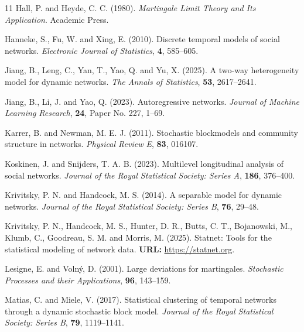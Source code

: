 \documentclass[12pt]{article}
\newcommand{\0}{{\bf 0}}
\begin{document}
\begin{thebibliography}{11}
Hall, P. and Heyde, C. C. (1980). \textit{Martingale Limit Theory and Its Application}. Academic Press.

Hanneke, S., Fu, W. and Xing, E. (2010). Discrete temporal models of social networks. \textit{Electronic Journal of Statistics}, \textbf{4}, 585–605.

Jiang, B., Leng, C., Yan, T., Yao, Q. and Yu, X. (2025). A two-way heterogeneity model for dynamic networks. \textit{The Annals of Statistics}, \textbf{53}, 2617--2641.

Jiang, B., Li, J. and Yao, Q. (2023). Autoregressive networks. \textit{Journal of Machine Learning Research}, \textbf{24}, Paper No. 227, 1--69.


Karrer, B. and Newman, M. E. J. (2011). Stochastic blockmodels and community structure in networks. \textit{Physical Review E}, \textbf{83}, 016107.

Koskinen, J. and Snijders, T. A. B. (2023). Multilevel longitudinal analysis of social networks. \textit{Journal of the Royal Statistical Society: Series A}, \textbf{186}, 376--400.


Krivitsky, P. N. and Handcock, M. S. (2014). A separable model for dynamic networks. \textit{Journal of the Royal Statistical Society: Series B}, \textbf{76}, 29–48.

Krivitsky, P. N., Handcock, M. S., Hunter, D. R., Butts, C. T., Bojanowski, M., Klumb,
C., Goodreau, S. M. and Morris, M. (2025).
\newblock Statnet: Tools for the statistical modeling of network data.
\newblock \textbf{URL:}  { \hypersetup{urlcolor=black}\url{https://statnet.org}}.



Lesigne, E. and Voln\'{y}, D. (2001). Large deviations for martingales. \textit{Stochastic Processes and their Applications}, \textbf{96}, 143–159.

Matias, C. and Miele, V. (2017). Statistical clustering of temporal networks through a dynamic stochastic block model. \textit{Journal of the Royal Statistical Society: Series B}, \textbf{79}, 1119--1141.


\end{thebibliography}
\end{document}
